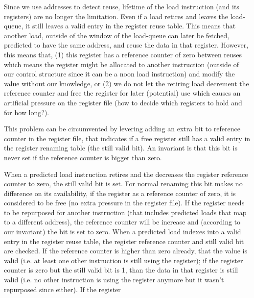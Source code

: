 \documentclass{sig-alternate}
\begin{document}
Since we use addresses to detect reuse, lifetime of the load instruction (and its registers) are no longer the limitation. Even if a load retires and leaves the load-queue, it still leaves a valid entry in the register reuse table. This means that another load, outside of the window of the load-queue can later be fetched, predicted to have the same address, and reuse the data in that register. However, this means that, (1) this register has a reference counter of zero between reuses which means the register might be allocated to another instruction (outside of our control structure since it can be a noon load instruction) and modify the value without our knowledge, or (2) we do not let the retiring load decrement the reference counter and free the register for later (potential) use which causes an artificial pressure on the register file (how to decide which registers to hold and for how long?).

This problem can be circumvented by levering adding an extra bit to reference counter in the register file, that indicates if a free register still has a valid entry in the register renaming table (the still valid bit). An invariant is that this bit is never set if the reference counter is bigger than zero.

When a predicted load instruction retires and the decreases the register reference counter to zero, the still valid bit is set. For normal renaming this bit makes no difference on its availability, if the register as a reference counter of zero, it is considered to be free (no extra pressure in the register file). If the register needs to be repurposed for another instruction (that includes predicted loads that map to a different address), the reference counter will be increase and (according to our invariant) the bit is set to zero. When a predicted load indexes into a valid entry in the register reuse table, the register reference counter and still valid bit are checked. If the reference counter is higher than zero already, that the value is valid (i.e. at least one other instruction is still using the register); if the register counter is zero but the still valid bit is 1, than the data in that register is still valid (i.e. no other instruction is using the register anymore but it wasn't repurposed since either). If the register   
\end{document}
